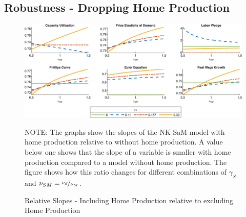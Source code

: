 \documentclass[12pt,3p,authoryear,review]{elsarticle}
\begin{document}
\subsection{Robustness - Dropping Home Production}\label{sec:robust_hw}%
\begin{figure}[h!]%
    \centering%
    \caption{Relative Slopes - Including Home Production relative to excluding Home Production}\label{fig:app_slopes_robust_hw}%
    \includegraphics[width=\textwidth]{fig_18_slopes_robust_hw.png}\\%
    {\tiny \singlespacing NOTE: The graphs show the slopes of the NK-SaM model with home production relative to without home production. A value below one shows that the slope of a variable is smaller with home production compared to a model without home production. The figure shows how this ratio changes for different combinations of $\gamma_S$ and $\nu_{SM} = \nicefrac{\nu_S}{\nu_M}$.\par}%
\end{figure}%
\end{document}
